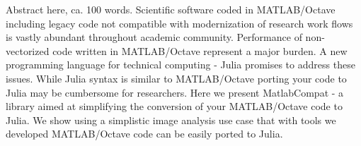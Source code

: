 Abstract here, ca. 100 words.
Scientific software coded in MATLAB/Octave including legacy code not compatible with modernization of research work flows is vastly abundant throughout academic community. Performance of non-vectorized code written in MATLAB/Octave represent a major burden. A new programming language for technical computing - Julia promises to address these issues. While Julia syntax is similar to MATLAB/Octave porting your code to Julia may be cumbersome for researchers. Here we present MatlabCompat - a library aimed at simplifying the conversion of your MATLAB/Octave code to Julia. We show using a simplistic image analysis use case that with tools we developed MATLAB/Octave code can be easily ported to Julia.